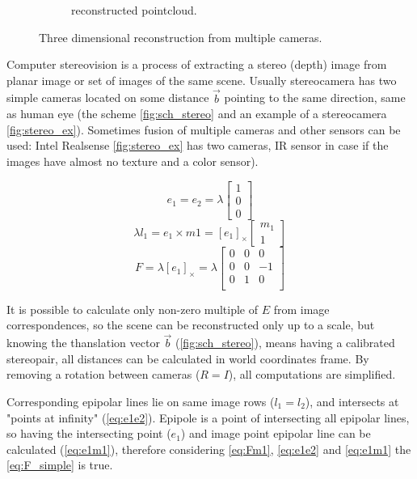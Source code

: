 \begin{figure}[h]
\begin{subfigure}[b]{0.65\textwidth}
      \caption{reconstructed pointcloud.}
      \label{fig:chb2}
    \end{subfigure}
    \caption{Three dimensional reconstruction from multiple cameras.}
    \label{fig:chb}
\end{figure}

Computer stereovision is a process of extracting a stereo (depth) image from planar image or set of images of the same scene. Usually stereocamera has two simple cameras located on some distance $\vec{b}$ pointing to the same direction, same as human eye (the scheme \autoref{fig:sch_stereo} and an example of a stereocamera \autoref{fig:stereo_ex}). 
Sometimes fusion of multiple cameras and other sensors can be used:
Intel Realsense \autoref{fig:stereo_ex} has two cameras, IR sensor in case if the images have almost no texture and a color sensor). 

\begin{equation}
    \label{eq:e1e2}
    e_1 = e_2 = \lambda \begin{bmatrix} 1 \\ 0 \\ 0 \end{bmatrix}
\end{equation}
\begin{equation}
    \label{eq:e1m1}
    \lambda l_1 = e_1 \times m1 = [e_1]_\times \begin{bmatrix} m_1 \\ 1\end{bmatrix}
\end{equation}
\begin{equation}
    \label{eq:F_simple}
    F = \lambda [e_1]_\times = \lambda \begin{bmatrix}
        0 & 0 & 0 \\
        0 & 0 & -1 \\
        0 & 1 & 0 \\
    \end{bmatrix}
\end{equation}

It is possible to calculate only non-zero multiple of $E$ from image correspondences, so the scene can be reconstructed only up to a scale, but knowing the thanslation vector $\vec{b}$ (\autoref{fig:sch_stereo}), means having a calibrated stereopair, all distances can be calculated in world coordinates frame.
By removing a rotation between cameras ($R = I$), all computations are simplified.

Corresponding epipolar lines lie on same image rows ($l_1 = l_2$), and intersects at "points at infinity" (\autoref{eq:e1e2}). Epipole is a point of intersecting all epipolar lines, so having the intersecting point ($e_1$) and image point epipolar line can be calculated (\autoref{eq:e1m1}), therefore considering \autoref{eq:Fm1}, \autoref{eq:e1e2} and \autoref{eq:e1m1} the \autoref{eq:F_simple} is true.


